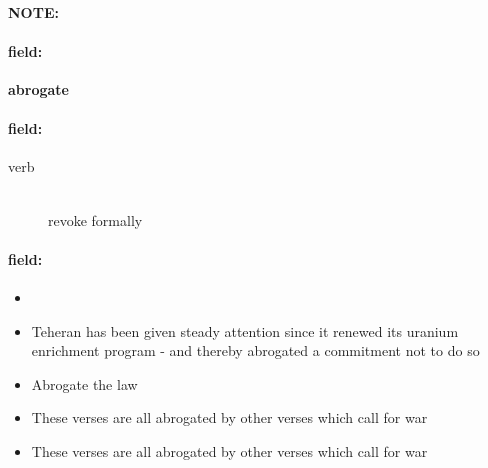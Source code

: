 \documentclass[12pt]{article}
\newenvironment{note}{\paragraph{NOTE:}}{}
\newenvironment{field}{\paragraph{field:}}{}
\begin{document}
\begin{note}
\begin{field}
\textbf{\large abrogate}
\end{field}


\begin{field}
\begin{description}
\item[verb] \hfill \\ 
revoke formally

\end{description}
\end{field}

\begin{field}
\begin{itemize}
\item 
\item Teheran has been given steady attention since it renewed its uranium enrichment program - and thereby abrogated a commitment not to do so
\item Abrogate the law
\item These verses are all abrogated by other verses which call for war
\item These verses are all abrogated by other verses which call for war
\end{itemize}
\end{field}
\end{note}
\end{document}
